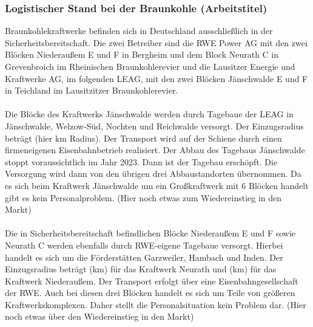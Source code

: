 		\subsubsection{Logistischer Stand bei der Braunkohle (Arbeitstitel)}
		Braunkohlekraftwerke befinden sich in Deutschland ausschließlich in der Sicherheitsbereitschaft. Die zwei Betreiber sind die RWE Power AG mit den zwei Blöcken Niederaußem E und F in Bergheim und dem Block Neurath C in Grevenbroich im Rheinischen Braunkohlerevier und die Lausitzer Energie und Kraftwerke AG, im folgenden LEAG, mit den zwei Blöcken Jänschwalde E und F in Teichland im Lausitzitzer Braunkohlerevier. 
		\\
		\\
		Die Blöcke des Kraftwerks Jänschwalde werden durch Tagebaue der LEAG in Jänschwalde, Welzow-Süd, Nochten und Reichwalde versorgt. Der Einzugsradius beträgt (hier km Radius). Der Transport wird auf der Schiene durch einen firmeneigenen Eisenbahnbetrieb realisiert. Der Abbau des Tagebaus Jänschwalde stoppt voraussichtlich im Jahr 2023. Dann ist der Tagebau erschöpft. Die Versorgung wird dann von den übrigen drei Abbaustandorten übernommen.
		Da es sich beim Kraftwerk Jänschwalde um ein Großkraftwerk mit 6 Blöcken handelt gibt es kein Personalproblem. 
		(Hier noch etwas zum Wiedereinstieg in den Markt)
		\\
		\\
		Die in Sicherheitsbereitschaft befindlichen Blöcke Niederaußem E und F sowie Neurath C werden ebenfalls durch RWE-eigene Tagebaue versorgt. Hierbei handelt es sich um die Förderstätten Garzweiler, Hambach und Inden. Der Einzugsradius beträgt (km) für das Kraftwerk Neurath und (km) für das Kraftwerk Niederaußem. Der Transport erfolgt über eine Eisenbahngesellschaft der RWE. Auch bei diesen drei Blöcken handelt es sich um Teile von größeren Kraftwerkskomplexen. Daher stellt die Personalsituation kein Problem dar.
		(Hier noch etwas über den Wiedereinstieg in den Markt)
		
